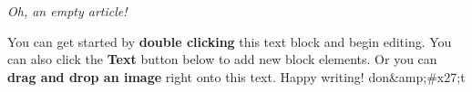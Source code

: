 \textit{Oh, an empty article!}

You can get started by \textbf{double clicking} this text block and begin editing. You can also click the \textbf{Text} button below to add new block elements. Or you can \textbf{drag and drop an image} right onto this text. Happy writing!
don&amp;#x27;t

